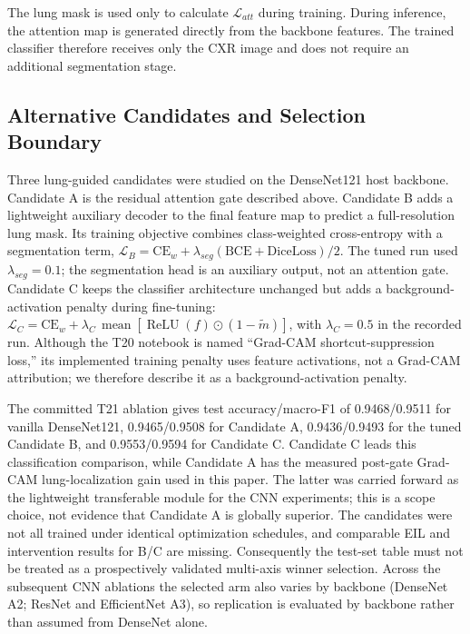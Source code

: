 \documentclass[sigconf,screen,nonacm]{acmart}
\begin{document}
The lung mask is used only to calculate $\mathcal{L}_{att}$ during training. During inference, the attention map is generated directly from the backbone features. The trained classifier therefore receives only the CXR image and does not require an additional segmentation stage.

\subsection{Alternative Candidates and Selection Boundary}
\label{sec:candidate-selection}
Three lung-guided candidates were studied on the DenseNet121 host backbone. Candidate A is the residual attention gate described above. Candidate B adds a lightweight auxiliary decoder to the final feature map to predict a full-resolution lung mask. Its training objective combines class-weighted cross-entropy with a segmentation term, $\mathcal{L}_{B}=\mathrm{CE}_{w}+\lambda_{seg}(\mathrm{BCE}+\mathrm{DiceLoss})/2$. The tuned run used $\lambda_{seg}=0.1$; the segmentation head is an auxiliary output, not an attention gate. Candidate C keeps the classifier architecture unchanged but adds a background-activation penalty during fine-tuning: $\mathcal{L}_{C}=\mathrm{CE}_{w}+\lambda_{C}\,\operatorname{mean}[\operatorname{ReLU}(f)\odot(1-\tilde m)]$, with $\lambda_C=0.5$ in the recorded run. Although the T20 notebook is named ``Grad-CAM shortcut-suppression loss,'' its implemented training penalty uses feature activations, not a Grad-CAM attribution; we therefore describe it as a background-activation penalty.

The committed T21 ablation gives test accuracy/macro-F1 of 0.9468/0.9511 for vanilla DenseNet121, 0.9465/0.9508 for Candidate A, 0.9436/0.9493 for the tuned Candidate B, and 0.9553/0.9594 for Candidate C. Candidate C leads this classification comparison, while Candidate A has the measured post-gate Grad-CAM lung-localization gain used in this paper. The latter was carried forward as the lightweight transferable module for the CNN experiments; this is a scope choice, not evidence that Candidate A is globally superior. The candidates were not all trained under identical optimization schedules, and comparable EIL and intervention results for B/C are missing. Consequently the test-set table must not be treated as a prospectively validated multi-axis winner selection. Across the subsequent CNN ablations the selected arm also varies by backbone (DenseNet A2; ResNet and EfficientNet A3), so replication is evaluated by backbone rather than assumed from DenseNet alone.
\end{document}
